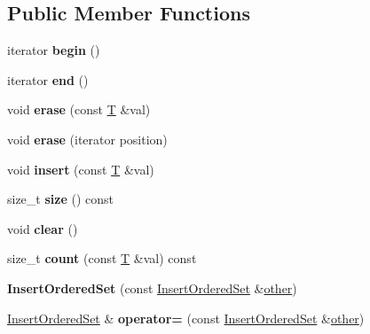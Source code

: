 \subsection*{Public Member Functions}
\begin{DoxyCompactItemize}
\item 
\mbox{\label{struct_c_f_g_1_1_insert_ordered_set_a9059855c7bf25f46761bd157fd3fff85}} 
iterator {\bfseries begin} ()
\item 
\mbox{\label{struct_c_f_g_1_1_insert_ordered_set_a00a4384630f382846e7923a73aa27113}} 
iterator {\bfseries end} ()
\item 
\mbox{\label{struct_c_f_g_1_1_insert_ordered_set_abca35710f1cdba28bc18c64f9227642d}} 
void {\bfseries erase} (const \mbox{\hyperlink{struct_t}{T}} \&val)
\item 
\mbox{\label{struct_c_f_g_1_1_insert_ordered_set_a1e075511494b8ea8ba73e12d38281649}} 
void {\bfseries erase} (iterator position)
\item 
\mbox{\label{struct_c_f_g_1_1_insert_ordered_set_aeeb5512c5fe8f2b34314e0666732b9dc}} 
void {\bfseries insert} (const \mbox{\hyperlink{struct_t}{T}} \&val)
\item 
\mbox{\label{struct_c_f_g_1_1_insert_ordered_set_a7f78b3ab94d6c8be89b989538a462673}} 
size\+\_\+t {\bfseries size} () const
\item 
\mbox{\label{struct_c_f_g_1_1_insert_ordered_set_ad50333c701600d013dba76a175de1d29}} 
void {\bfseries clear} ()
\item 
\mbox{\label{struct_c_f_g_1_1_insert_ordered_set_a0612c8172b9eea5981c9eee9f5d61956}} 
size\+\_\+t {\bfseries count} (const \mbox{\hyperlink{struct_t}{T}} \&val) const
\item 
\mbox{\label{struct_c_f_g_1_1_insert_ordered_set_aebdc4b4bd8ed248443db06b8da0bd341}} 
{\bfseries Insert\+Ordered\+Set} (const \mbox{\hyperlink{struct_c_f_g_1_1_insert_ordered_set}{Insert\+Ordered\+Set}} \&\mbox{\hyperlink{structother}{other}})
\item 
\mbox{\label{struct_c_f_g_1_1_insert_ordered_set_a5e9620b373f645b0ceb931d2eb177f31}} 
\mbox{\hyperlink{struct_c_f_g_1_1_insert_ordered_set}{Insert\+Ordered\+Set}} \& {\bfseries operator=} (const \mbox{\hyperlink{struct_c_f_g_1_1_insert_ordered_set}{Insert\+Ordered\+Set}} \&\mbox{\hyperlink{structother}{other}})
\end{DoxyCompactItemize}
